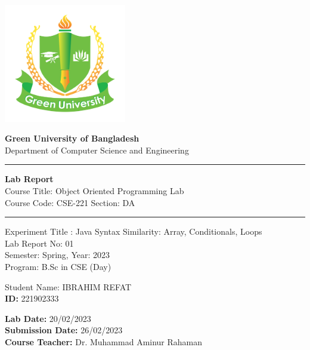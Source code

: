 \documentclass{article}
\begin{document}
\begin{titlepage}
  \begin{center}
  
    
    \includegraphics[width=0.4\textwidth]{logo.svg.png}
    
    {\LARGE\textbf{Green University of Bangladesh}}\\
    \vspace{0.5cm}
    {\Large Department of Computer Science and Engineering}\\
    \vspace{1cm}
    
    \rule{\linewidth}{0.5mm}
    
    \vspace{0.5cm}
    {\LARGE\textbf{Lab Report}}\\
    \vspace{0.5cm}
    {\Large Course Title: Object Oriented Programming Lab}\\
    \vspace{0.2cm}
    {\Large Course Code: CSE-221 Section: DA}\\
    \vspace{0.5cm}
   \rule{\linewidth}{0.5mm}
    \vspace{1cm}
    \LARGE \textbf{} Experiment Title : \LARGE Java Syntax Similarity: Array, Conditionals, Loops\\
     \LARGE \textbf{} Lab Report No: \LARGE 01\\
     \LARGE \textbf{} Semester: \LARGE Spring, Year: 2023\\
    \vspace{0.5cm}
    \LARGE \textbf{} Program: B.Sc in CSE (Day)\\
    
    \vspace{3cm}
    \begin{tcolorbox}[colback=white,colframe=black,width=10cm,height=2cm]
      \LARGE{Student Name:} IBRAHIM REFAT \\
      \textbf{ID:} 221902333 \\
    \end{tcolorbox}
    
    \vspace{2cm}
    \textbf{Lab Date:} 20/02/2023 \\
    \vspace{0.2cm}
  \textbf{Submission Date:} 26/02/2023 \\
    \vspace{0.2cm}
   \textbf{Course Teacher:} Dr. Muhammad Aminur Rahaman
    
  \end{center}
\end{titlepage}
\end{document}

